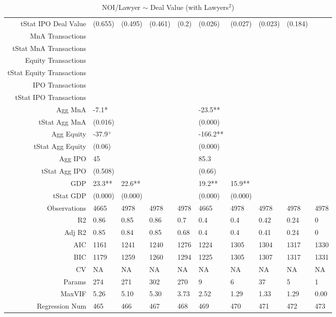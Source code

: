\begin{table}[ht]
\begin{tabular}{rlllllllll}
  tStat IPO Deal Value & (0.655) & (0.495) & (0.461) & (0.2) & (0.026) & (0.027) & (0.023) & (0.184) &  \\ 
  MnA Transactions &  &  &  &  &  &  &  &  &  \\ 
  tStat MnA Transactions &  &  &  &  &  &  &  &  &  \\ 
  Equity Transactions &  &  &  &  &  &  &  &  &  \\ 
  tStat Equity Transactions &  &  &  &  &  &  &  &  &  \\ 
  IPO Transactions &  &  &  &  &  &  &  &  &  \\ 
  tStat IPO Transactions &  &  &  &  &  &  &  &  &  \\ 
  Agg MnA & -7.1* &  &  &  & -23.5** &  &  &  &  \\ 
  tStat Agg MnA & (0.016) &  &  &  & (0.000) &  &  &  &  \\ 
  Agg Equity & -37.9$^{+}$ &  &  &  & -166.2** &  &  &  &  \\ 
  tStat Agg Equity & (0.06) &  &  &  & (0.000) &  &  &  &  \\ 
  Agg IPO & 45 &  &  &  & 85.3 &  &  &  &  \\ 
  tStat Agg IPO & (0.508) &  &  &  & (0.66) &  &  &  &  \\ 
  GDP & 23.3** & 22.6** &  &  & 19.2** & 15.9** &  &  &  \\ 
  tStat GDP & (0.000) & (0.000) &  &  & (0.000) & (0.000) &  &  &  \\ 
  Observations & 4665 & 4978 & 4978 & 4978 & 4665 & 4978 & 4978 & 4978 & 4978 \\ 
  R2 & 0.86 & 0.85 & 0.86 & 0.7 & 0.4 & 0.4 & 0.42 & 0.24 & 0 \\ 
  Adj R2 & 0.85 & 0.84 & 0.85 & 0.68 & 0.4 & 0.4 & 0.41 & 0.24 & 0 \\ 
  AIC & 1161 & 1241 & 1240 & 1276 & 1224 & 1305 & 1304 & 1317 & 1330 \\ 
  BIC & 1179 & 1259 & 1260 & 1294 & 1225 & 1305 & 1307 & 1317 & 1331 \\ 
  CV & NA & NA & NA & NA & NA & NA & NA & NA & NA \\ 
  Params & 274 & 271 & 302 & 270 & 9 & 6 & 37 & 5 & 1 \\ 
  MaxVIF & 5.26 & 5.10 & 5.30 & 3.73 & 2.52 & 1.29 & 1.33 & 1.29 & 0.00 \\ 
  Regression Num & 465 & 466 & 467 & 468 & 469 & 470 & 471 & 472 & 473 \\ 
   \hline
\end{tabular}
\caption{NOI/Lawyer $\sim$ Deal Value (with Lawyers$^2$)} 
\end{table}
